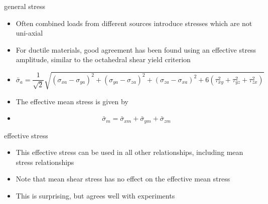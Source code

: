 \documentclass[10pt]{beamer}
\begin{document}
\begin{frame}{general stress}
\begin{itemize}[<+->]
	\item Often combined loads from different sources introduce stresses which are not uni-axial
	\item For ductile materials, good agreement has been found using an effective stress amplitude, similar to the octahedral shear yield criterion
	\item[] \begin{equation}
	\bar{\sigma}_a = \frac{1}{\sqrt{2}}\sqrt{(\sigma_{xa}-\sigma_{ya})^2 + (\sigma_{ya}-\sigma_{za})^2 + (\sigma_{za}-\sigma_{xa})^2 + 6(\tau_{xy}^2 + \tau_{yz}^2 + \tau_{zx}^2)}
	\end{equation}
	\item The effective mean stress is given by
	\item[] \begin{equation}
	\bar{\sigma}_m = \bar{\sigma}_{xm} + \bar{\sigma}_{ym} + \bar{\sigma}_{zm}
	\end{equation}
\end{itemize}
\end{frame}

\begin{frame}{effective stress}
	\begin{itemize}[<+->]
		\item This effective stress can be used in all other relationships, including mean stress relationships
		\item Note that mean shear stress has no effect on the effective mean stress
		\item This is surprising, but agrees well with experiments
	\end{itemize}
\end{frame}
\end{document}
